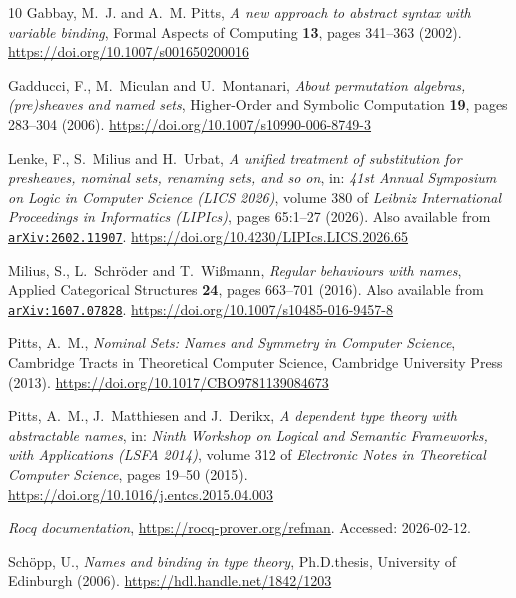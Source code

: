 \documentclass[11pt,a4paper]{amsart}
\theoremstyle{plain}
\theoremstyle{definition}
\theoremstyle{remark}
\newcommand{\arxiv}[1]{\href{https://arxiv.org/abs/#1}{{\tt arXiv:#1}}}
\begin{document}
\begin{thebibliography}{10}
Gabbay, M.~J. and A.~M. Pitts, \emph{A new approach to abstract syntax with
  variable binding}, Formal Aspects of Computing \textbf{13}, pages 341--363
  (2002).
\newline\urlprefix\url{https://doi.org/10.1007/s001650200016}

Gadducci, F., M.~Miculan and U.~Montanari, \emph{About permutation algebras,
  (pre)sheaves and named sets}, Higher-Order and Symbolic Computation
  \textbf{19}, pages 283--304 (2006).
\newline\urlprefix\url{https://doi.org/10.1007/s10990-006-8749-3}

Lenke, F., S.~Milius and H.~Urbat, \emph{A unified treatment of substitution
  for presheaves, nominal sets, renaming sets, and so on}, in: \emph{41st
  Annual Symposium on Logic in Computer Science (LICS 2026)}, volume 380 of
  \emph{Leibniz International Proceedings in Informatics (LIPIcs)}, pages
  65:1--27 (2026). Also available from \arxiv{2602.11907}.
\newline\urlprefix\url{https://doi.org/10.4230/LIPIcs.LICS.2026.65}

Milius, S., L.~Schröder and T.~Wißmann, \emph{Regular behaviours with names},
  Applied Categorical Structures \textbf{24}, pages 663--701 (2016). Also
  available from \arxiv{1607.07828}.
\newline\urlprefix\url{https://doi.org/10.1007/s10485-016-9457-8}

Pitts, A.~M., \emph{Nominal Sets: Names and Symmetry in Computer Science},
  Cambridge Tracts in Theoretical Computer Science, Cambridge University Press
  (2013).
\newline\urlprefix\url{https://doi.org/10.1017/CBO9781139084673}

Pitts, A.~M., J.~Matthiesen and J.~Derikx, \emph{A dependent type theory with
  abstractable names}, in: \emph{Ninth Workshop on Logical and Semantic
  Frameworks, with Applications (LSFA 2014)}, volume 312 of \emph{Electronic
  Notes in Theoretical Computer Science}, pages 19--50 (2015).
\newline\urlprefix\url{https://doi.org/10.1016/j.entcs.2015.04.003}

\emph{{Rocq} documentation}, \url{https://rocq-prover.org/refman}. Accessed:
  2026-02-12.

Sch\"opp, U., \emph{Names and binding in type theory}, {Ph.D.\@ thesis},
  University of Edinburgh (2006).
\newline\urlprefix\url{https://hdl.handle.net/1842/1203}


\end{thebibliography}
\end{document}
